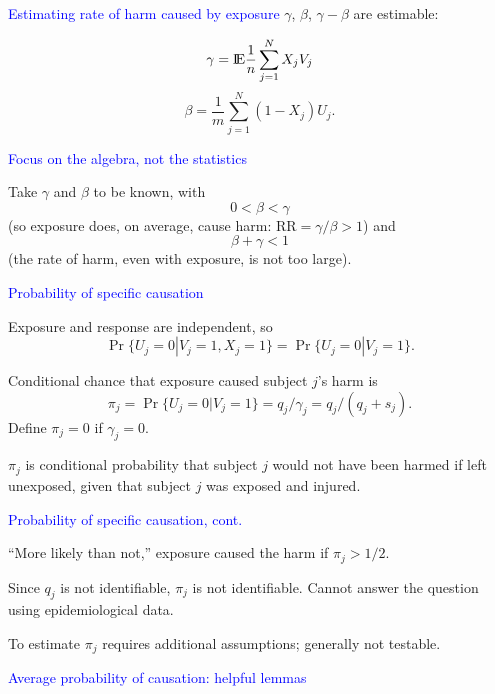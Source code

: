 \documentclass[landscape]{slides}
\newcommand{\EE}{\hbox{I\kern-.1667em\hbox{E}}}
\newcommand{\RR}{{\mbox{RR}}}
\newcommand{\beq}{\begin{equation}}
\newcommand{\eeq}{\end{equation}}
\begin{document}
\begin{slide}
\begin{slide}{\textcolor{blue}{Estimating rate of harm caused by exposure}}
$\gamma$, $\beta$,  $\gamma - \beta$ are estimable:

\beq
     \gamma = \EE \frac{1}{n} \sum_{j=1}^N X_j V_j 
\eeq
\beq
    \beta =  \frac{1}{m} \sum_{j=1}^N (1-X_j) U_j .
\eeq


\end{slide}

\begin{slide}{\textcolor{blue}{Focus on the algebra, not the statistics}}

Take $\gamma$ and $\beta$ to be known, with
\beq
    0 < \beta < \gamma
\eeq
(so exposure does, on average, cause harm: $\RR  = \gamma/\beta > 1$)
and
\beq
   \beta + \gamma < 1
\eeq
(the rate of harm, even with exposure, is not too large).

\end{slide}

\begin{slide}{\textcolor{blue}{Probability of specific causation}}

Exposure and response are independent, so
\beq
    \Pr \{ U_j = 0 | V_j = 1, X_j = 1 \} = \Pr \{ U_j = 0 | V_j = 1 \}.
\eeq

Conditional chance that exposure caused subject $j$'s harm is
\beq
   \pi_j = \Pr \{ U_j = 0 | V_j = 1 \} = q_j/\gamma_j = q_j/(q_j + s_j).
\eeq
Define $\pi_j = 0$ if $\gamma_j = 0$.

$\pi_j$ is conditional probability that subject $j$ would not have been harmed
if left unexposed, given that subject $j$ was exposed and injured.

\end{slide}

\begin{slide}{\textcolor{blue}{Probability of specific causation, cont.}}


``More likely than not,'' exposure caused the harm if $\pi_j > 1/2$.

Since $q_j$ is not identifiable, $\pi_j$ is not identifiable.
Cannot answer the question using epidemiological data.

To estimate $\pi_j$ requires additional assumptions; generally not testable.

\end{slide}

\begin{slide}{\textcolor{blue}{Average probability of causation: helpful lemmas}}


\end{slide}
\end{slide}
\end{document}
